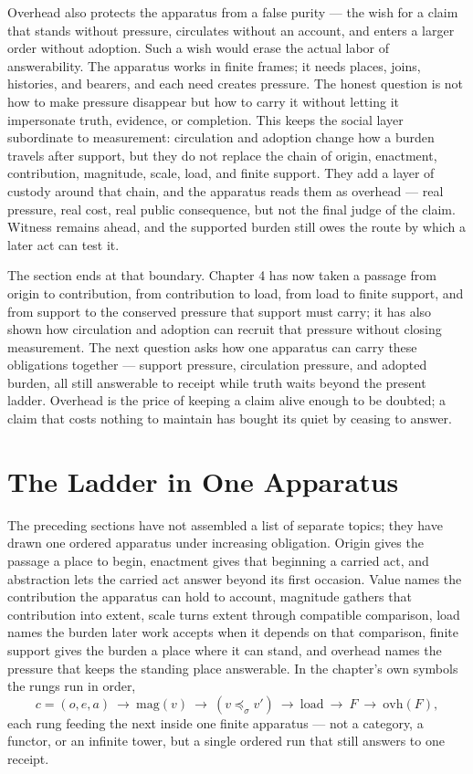 Overhead also protects the apparatus from a false purity --- the wish for a claim that stands without pressure, circulates without an account, and enters a larger order without adoption. Such a wish would erase the actual labor of answerability. The apparatus works in finite frames; it needs places, joins, histories, and bearers, and each need creates pressure. The honest question is not how to make pressure disappear but how to carry it without letting it impersonate truth, evidence, or completion. This keeps the social layer subordinate to measurement: circulation and adoption change how a burden travels after support, but they do not replace the chain of origin, enactment, contribution, magnitude, scale, load, and finite support. They add a layer of custody around that chain, and the apparatus reads them as overhead --- real pressure, real cost, real public consequence, but not the final judge of the claim. Witness remains ahead, and the supported burden still owes the route by which a later act can test it.

The section ends at that boundary. Chapter 4 has now taken a passage from origin to contribution, from contribution to load, from load to finite support, and from support to the conserved pressure that support must carry; it has also shown how circulation and adoption can recruit that pressure without closing measurement. The next question asks how one apparatus can carry these obligations together --- support pressure, circulation pressure, and adopted burden, all still answerable to receipt while truth waits beyond the present ladder. Overhead is the price of keeping a claim alive enough to be doubted; a claim that costs nothing to maintain has bought its quiet by ceasing to answer.

\section{The Ladder in One Apparatus}

The preceding sections have not assembled a list of separate topics; they have drawn one ordered apparatus under increasing obligation. Origin gives the passage a place to begin, enactment gives that beginning a carried act, and abstraction lets the carried act answer beyond its first occasion. Value names the contribution the apparatus can hold to account, magnitude gathers that contribution into extent, scale turns extent through compatible comparison, load names the burden later work accepts when it depends on that comparison, finite support gives the burden a place where it can stand, and overhead names the pressure that keeps the standing place answerable. In the chapter's own symbols the rungs run in order,
\[ c = (o,e,a) \ \longrightarrow\ \mathrm{mag}(v) \ \longrightarrow\ (v \preceq_{\sigma} v') \ \longrightarrow\ \mathrm{load} \ \longrightarrow\ F \ \longrightarrow\ \mathrm{ovh}(F), \]
each rung feeding the next inside one finite apparatus --- not a category, a functor, or an infinite tower, but a single ordered run that still answers to one receipt.

